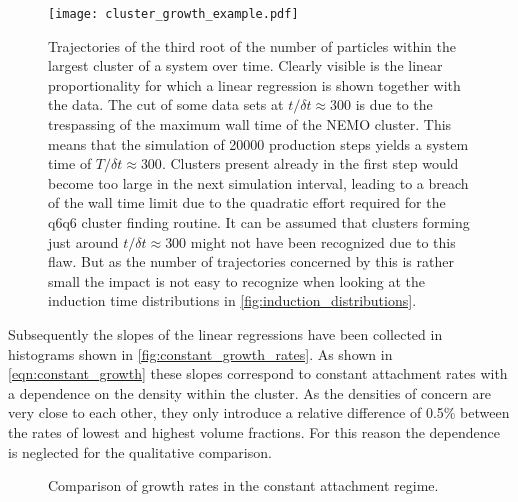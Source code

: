 \begin{figure}[ht]
\label{fig:cluster_growth_example}
\centering
\texttt{[image: cluster\_growth\_example.pdf]}
\caption[Largest cluster trajectories from production data with constant attachment rates]{Trajectories of the third root of the number of particles within the largest cluster of a system over time. Clearly visible is the linear proportionality for which a linear regression is shown together with the data. The cut of some data sets at $t/\delta t \approx 300$ is due to the trespassing of the maximum wall time of the NEMO cluster. This means that the simulation of 20000 production steps yields a system time of $T/\delta t \approx 300$. Clusters present already in the first step would become too large in the next simulation interval, leading to a breach of the wall time limit due to the quadratic effort required for the q6q6 cluster finding routine. It can be assumed that clusters forming just around $t/\delta t \approx 300$ might not have been recognized due to this flaw. But as the number of trajectories concerned by this is rather small the impact is not easy to recognize when looking at the induction time distributions in \autoref{fig:induction_distributions}.}
\label{fig:cluster_growth_example}
\end{figure}

Subsequently the slopes of the linear regressions have been collected in histograms shown in \autoref{fig:constant_growth_rates}. As shown in \autoref{eqn:constant_growth} these slopes correspond to constant attachment rates with a dependence on the density within the cluster. As the densities of concern are very close to each other, they only introduce a relative difference of 0.5\% between the rates of lowest and highest volume fractions. For this reason the dependence is neglected for the qualitative comparison.\\ 

\begin{figure}[ht]
\begin{center}
 \hspace{0.5cm}
\caption[Results of constant attachment rate measurement from production data]{Comparison of growth rates in the constant attachment regime.}
\label{fig:constant_growth_rates}
\end{center}
\end{figure}

